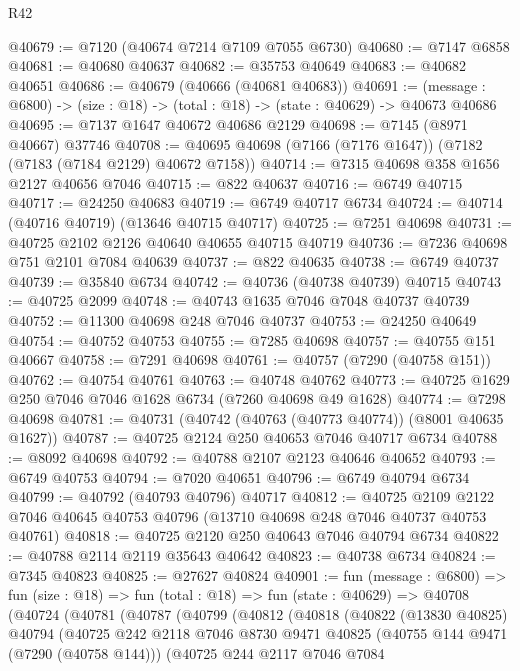 \begin{lexlean}{R42}
\begin{coremodule}
{@40679 := @7120 (@40674 @7214 @7109 @7055 @6730)
@40680 := @7147 @6858
@40681 := @40680 @40637
@40682 := @35753 @40649
@40683 := @40682 @40651
@40686 := @40679 (@40666 (@40681 @40683))
@40691 := (message : @6800) -> (size : @18) -> (total : @18) -> (state : @40629) -> @40673 @40686
@40695 := @7137 @1647 @40672 @40686 @2129
@40698 := @7145 (@8971 @40667) @37746
@40708 := @40695 @40698 (@7166 (@7176 @1647)) (@7182 (@7183 (@7184 @2129) @40672 @7158))
@40714 := @7315 @40698 @358 @1656 @2127 @40656 @7046
@40715 := @822 @40637
@40716 := @6749 @40715
@40717 := @24250 @40683
@40719 := @6749 @40717 @6734
@40724 := @40714 (@40716 @40719) (@13646 @40715 @40717)
@40725 := @7251 @40698
@40731 := @40725 @2102 @2126 @40640 @40655 @40715 @40719
@40736 := @7236 @40698 @751 @2101 @7084 @40639
@40737 := @822 @40635
@40738 := @6749 @40737
@40739 := @35840 @6734
@40742 := @40736 (@40738 @40739) @40715
@40743 := @40725 @2099
@40748 := @40743 @1635 @7046 @7048 @40737 @40739
@40752 := @11300 @40698 @248 @7046 @40737
@40753 := @24250 @40649
@40754 := @40752 @40753
@40755 := @7285 @40698
@40757 := @40755 @151 @40667
@40758 := @7291 @40698
@40761 := @40757 (@7290 (@40758 @151))
@40762 := @40754 @40761
@40763 := @40748 @40762
@40773 := @40725 @1629 @250 @7046 @7046 @1628 @6734 (@7260 @40698 @49 @1628)
@40774 := @7298 @40698
@40781 := @40731 (@40742 (@40763 (@40773 @40774)) (@8001 @40635 @1627))
@40787 := @40725 @2124 @250 @40653 @7046 @40717 @6734
@40788 := @8092 @40698
@40792 := @40788 @2107 @2123 @40646 @40652
@40793 := @6749 @40753
@40794 := @7020 @40651
@40796 := @6749 @40794 @6734
@40799 := @40792 (@40793 @40796) @40717
@40812 := @40725
    @2109
    @2122
    @7046
    @40645
    @40753
    @40796
    (@13710 @40698 @248 @7046 @40737 @40753 @40761)
@40818 := @40725 @2120 @250 @40643 @7046 @40794 @6734
@40822 := @40788 @2114 @2119 @35643 @40642
@40823 := @40738 @6734
@40824 := @7345 @40823
@40825 := @27627 @40824
@40901 := fun (message : @6800) =>
  fun (size : @18) =>
  fun (total : @18) =>
  fun (state : @40629) =>
  @40708
    (@40724
      (@40781
        (@40787
          (@40799
            (@40812
              (@40818
                (@40822
                  (@13830 @40825)
                  @40794
                  (@40725
                    @242
                    @2118
                    @7046
                    @8730
                    @9471
                    @40825
                    (@40755 @144 @9471 (@7290 (@40758 @144)))
                    (@40725
                      @244
                      @2117
                      @7046
                      @7084
}
\end{coremodule}
\end{lexlean}
